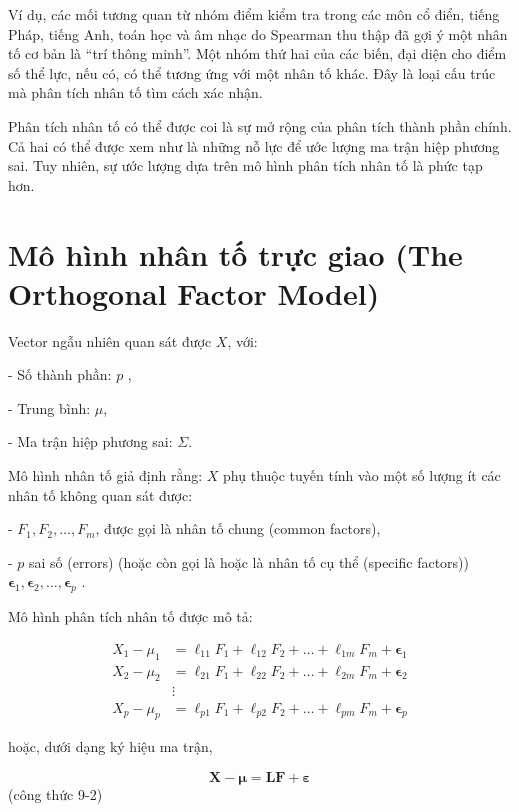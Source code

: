 \documentclass{article}
\begin{document}
Ví dụ, các mối tương quan từ nhóm điểm kiểm tra trong các môn cổ điển, tiếng Pháp, tiếng Anh, toán học và âm nhạc do Spearman thu thập đã gợi ý một nhân tố cơ bản là “trí thông minh”. Một nhóm thứ hai của các biến, đại diện cho điểm số thể lực, nếu có, có thể tương ứng với một nhân tố khác. Đây là loại cấu trúc mà phân tích nhân tố tìm cách xác nhận.

Phân tích nhân tố có thể được coi là sự mở rộng của phân tích thành phần chính. Cả hai có thể được xem như là những nỗ lực để ước lượng ma trận hiệp phương sai. Tuy nhiên, sự ước lượng dựa trên mô hình phân tích nhân tố là phức tạp hơn.
\vspace{0.5cm}


\section* {Mô hình nhân tố trực giao (The Orthogonal Factor Model)}
\vspace{0.cm}


Vector ngẫu nhiên quan sát được \(X\), với:

- Số thành phần: \(p\) ,

- Trung bình: \(\mu\),

- Ma trận hiệp phương sai: \(\Sigma\).

Mô hình nhân tố giả định rằng: \(X\) phụ thuộc tuyến tính vào một số lượng ít các nhân tố không quan sát được:

- \(F_1, F_2, \ldots, F_m\), được gọi là nhân tố chung (common factors),

- \(p\) sai số (errors) (hoặc còn gọi là hoặc là nhân tố cụ thể (specific factors))  \(\boldsymbol{\epsilon}_1, \boldsymbol{\epsilon}_2, \ldots, \boldsymbol{\epsilon}_p\) .

Mô hình phân tích nhân tố được mô tả:

\begin{align*}
X_1 - \mu_1 &= \ell_{11}F_1 + \ell_{12}F_2 + \ldots + \ell_{1m}F_m + \boldsymbol{\epsilon}_1 \\
X_2 - \mu_2 &= \ell_{21}F_1 + \ell_{22}F_2 + \ldots + \ell_{2m}F_m + \boldsymbol{\epsilon}_2 \\
& \vdots \\
X_p - \mu_p &= \ell_{p1}F_1 + \ell_{p2}F_2 + \ldots + \ell_{pm}F_m + \boldsymbol{\epsilon}_p
\end{align*}

hoặc, dưới dạng ký hiệu ma trận,

\[
\mathbf{X} - \boldsymbol{\mu} = \mathbf{L}\mathbf{F} + \boldsymbol{\varepsilon}
\] (công thức 9-2)
\end{document}

